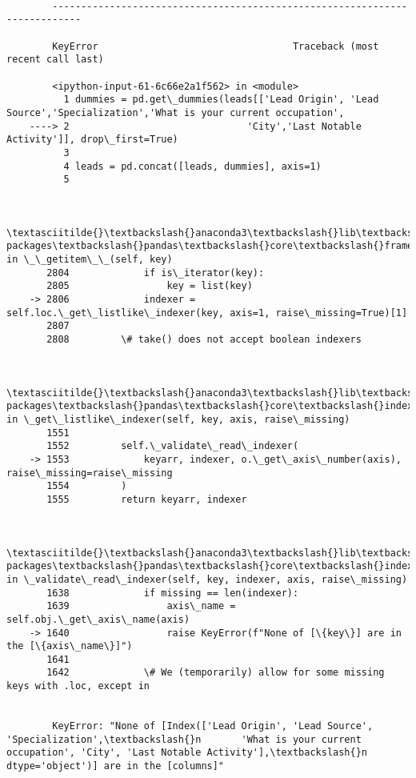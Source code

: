\documentclass[11pt]{article}
\begin{document}
    \begin{Verbatim}[commandchars=\\\{\}]

        ---------------------------------------------------------------------------

        KeyError                                  Traceback (most recent call last)

        <ipython-input-61-6c66e2a1f562> in <module>
          1 dummies = pd.get\_dummies(leads[['Lead Origin', 'Lead Source','Specialization','What is your current occupation',
    ----> 2                               'City','Last Notable Activity']], drop\_first=True)
          3 
          4 leads = pd.concat([leads, dummies], axis=1)
          5 
    

        \textasciitilde{}\textbackslash{}anaconda3\textbackslash{}lib\textbackslash{}site-packages\textbackslash{}pandas\textbackslash{}core\textbackslash{}frame.py in \_\_getitem\_\_(self, key)
       2804             if is\_iterator(key):
       2805                 key = list(key)
    -> 2806             indexer = self.loc.\_get\_listlike\_indexer(key, axis=1, raise\_missing=True)[1]
       2807 
       2808         \# take() does not accept boolean indexers
    

        \textasciitilde{}\textbackslash{}anaconda3\textbackslash{}lib\textbackslash{}site-packages\textbackslash{}pandas\textbackslash{}core\textbackslash{}indexing.py in \_get\_listlike\_indexer(self, key, axis, raise\_missing)
       1551 
       1552         self.\_validate\_read\_indexer(
    -> 1553             keyarr, indexer, o.\_get\_axis\_number(axis), raise\_missing=raise\_missing
       1554         )
       1555         return keyarr, indexer
    

        \textasciitilde{}\textbackslash{}anaconda3\textbackslash{}lib\textbackslash{}site-packages\textbackslash{}pandas\textbackslash{}core\textbackslash{}indexing.py in \_validate\_read\_indexer(self, key, indexer, axis, raise\_missing)
       1638             if missing == len(indexer):
       1639                 axis\_name = self.obj.\_get\_axis\_name(axis)
    -> 1640                 raise KeyError(f"None of [\{key\}] are in the [\{axis\_name\}]")
       1641 
       1642             \# We (temporarily) allow for some missing keys with .loc, except in
    

        KeyError: "None of [Index(['Lead Origin', 'Lead Source', 'Specialization',\textbackslash{}n       'What is your current occupation', 'City', 'Last Notable Activity'],\textbackslash{}n      dtype='object')] are in the [columns]"

    \end{Verbatim}
\end{document}

